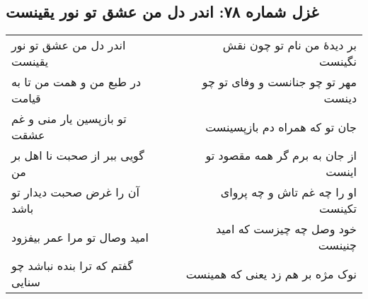 \begin{center}
\section*{غزل شماره ۷۸: اندر دل من عشق تو نور یقینست}
\label{sec:078}
\begin{longtable}{l p{0.5cm} r}
اندر دل من عشق تو نور یقینست
&&
بر دیدهٔ من نام تو چون نقش نگینست
\\
در طبع من و همت من تا به قیامت
&&
مهر تو چو جنانست و وفای تو چو دینست
\\
تو بازپسین یار منی و غم عشقت
&&
جان تو که همراه دم بازپسینست
\\
گویی ببر از صحبت نا اهل بر من
&&
از جان به برم گر همه مقصود تو اینست
\\
آن را غرض صحبت دیدار تو باشد
&&
او را چه غم تاش و چه پروای تکینست
\\
امید وصال تو مرا عمر بیفزود
&&
خود وصل چه چیزست که امید چنینست
\\
گفتم که ترا بنده نباشد چو سنایی
&&
نوک مژه بر هم زد یعنی که همینست
\\
\end{longtable}
\end{center}
